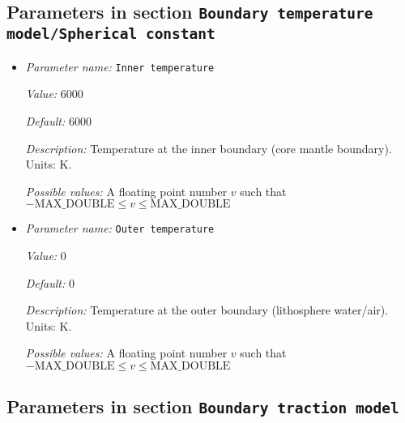 \subsection{Parameters in section \tt Boundary temperature model/Spherical constant}
\label{parameters:Boundary_20temperature_20model/Spherical_20constant}

\begin{itemize}
\item {\it Parameter name:} {\tt Inner temperature}
\label{parameters:Boundary temperature model/Spherical constant/Inner temperature}
\label{parameters:Boundary_20temperature_20model/Spherical_20constant/Inner_20temperature}


{\it Value:} 6000


{\it Default:} 6000


{\it Description:} Temperature at the inner boundary (core mantle boundary). Units: K.


{\it Possible values:} A floating point number $v$ such that $-\text{MAX\_DOUBLE} \leq v \leq \text{MAX\_DOUBLE}$
\item {\it Parameter name:} {\tt Outer temperature}
\label{parameters:Boundary temperature model/Spherical constant/Outer temperature}
\label{parameters:Boundary_20temperature_20model/Spherical_20constant/Outer_20temperature}


{\it Value:} 0


{\it Default:} 0


{\it Description:} Temperature at the outer boundary (lithosphere water/air). Units: K.


{\it Possible values:} A floating point number $v$ such that $-\text{MAX\_DOUBLE} \leq v \leq \text{MAX\_DOUBLE}$
\end{itemize}

\subsection{Parameters in section \tt Boundary traction model}
\label{parameters:Boundary_20traction_20model}


